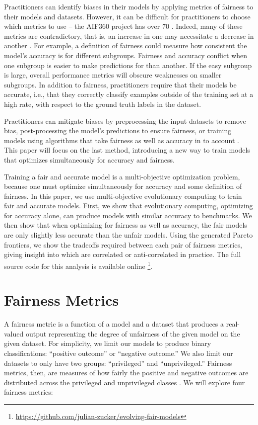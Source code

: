 \documentclass{elsarticle}
\begin{document}
Practitioners can identify biases in their models by applying metrics of fairness to their models and datasets. However, it can be difficult for practitioners to choose which metrics to use – the AIF360 project has over 70 \citep{Bellamy:2018}. Indeed, many of these metrics are contradictory, that is, an increase in one may necessitate a decrease in another \citep{Kleinberg:2016}. For example, a definition of fairness could measure how consistent the model’s accuracy is for different subgroups. Fairness and accuracy conflict when one subgroup is easier to make predictions for than another. If the easy subgroup is large, overall performance metrics will obscure weaknesses on smaller subgroups. In addition to fairness, practitioners require that their models be accurate, i.e., that they correctly classify examples outside of the training set at a high rate, with respect to the ground truth labels in the dataset.

Practitioners can mitigate biases by preprocessing the input datasets to remove bias, post-processing the model’s predictions to ensure fairness, or training models using algorithms that take fairness as well as accuracy in to account \citep{Angwin:2016}. This paper will focus on the last method, introducing a new way to train models that optimizes simultaneously for accuracy and fairness. 

Training a fair and accurate model is a multi-objective optimization problem, because one must optimize simultaneously for accuracy and some definition of fairness. In this paper, we use multi-objective evolutionary computing to train fair and accurate models. First, we show that evolutionary computing, optimizing for accuracy alone, can produce models with similar accuracy to benchmarks. We then show that when optimizing for fairness as well as accuracy, the fair models are only slightly less accurate than the unfair models. Using the generated Pareto frontiers, we show the tradeoffs required between each pair of fairness metrics, giving insight into which are correlated or anti-correlated in practice. The full source code for this analysis is available online \footnote{ \href{https://github.com/julian-zucker/evolving-fair-models}{https://github.com/julian-zucker/evolving-fair-models}}.

\section{Fairness Metrics}
A fairness metric is a function of a model and a dataset that produces a real-valued output representing the degree of unfairness of the given model on the given dataset. For simplicity, we limit our models to produce binary classifications: “positive outcome” or “negative outcome.” We also limit our datasets to only have two groups: “privileged” and “unprivileged.” Fairness metrics, then, are measures of how fairly the positive and negative outcomes are distributed across the privileged and unprivileged classes \citep{Binns:2017}. We will explore four fairness metrics:
\end{document}
